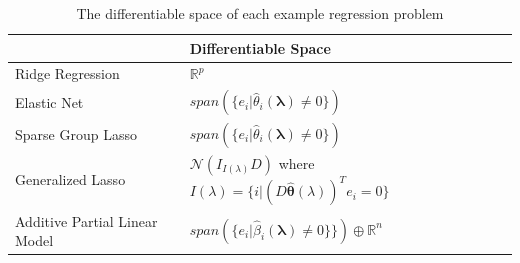 \documentclass[10pt,letterpaper]{article}
\begin{document}
\begin{table} 
\begin{center}

\begin{tabular}{| l | l | l | }
\hline
 &  Differentiable Space \\
\hline
Ridge Regression & $\mathbb{R}^p$\\
\hline
Elastic Net & $span(\{e_i | \hat{\theta}_i\left(\boldsymbol{\lambda}\right) \ne 0 \})$\\
\hline
Sparse Group Lasso & $span(\{e_i | \hat{\theta}_i\left(\boldsymbol{\lambda}\right) \ne 0 \})$ \\
\hline
Generalized Lasso & $\mathcal{N}(I_{I(\lambda)} D)$ where $I(\lambda) = \{ i | (D \hat{\boldsymbol{\theta}}(\lambda))^T e_i = 0 \}$ \\
\hline
Additive Partial Linear Model & $span(\{e_i | \hat{\beta}_i\left(\boldsymbol{\lambda}\right) \ne 0 \} \})  \oplus  \mathbb{R}^{n}$\\
\hline
\end{tabular}
\end{center}
\caption {The differentiable space of each example regression problem}
\label{table:differentiableSpace}
\end{table}
\end{document}
